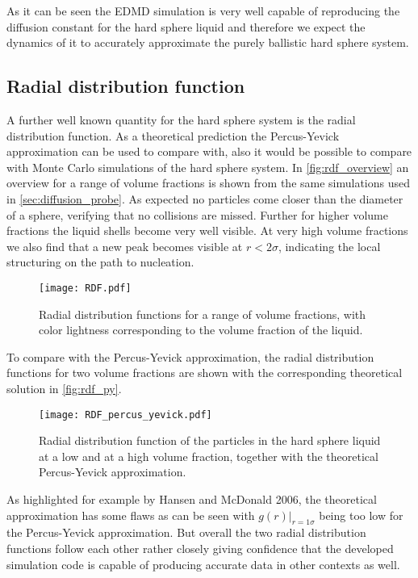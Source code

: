 As it can be seen the EDMD simulation is very well capable of reproducing the diffusion constant for the hard sphere liquid and therefore we expect the dynamics of it to accurately approximate the purely ballistic hard sphere system.

\subsection{Radial distribution function}
\label{sec:RDF_prob}
A further well known quantity for the hard sphere system is the radial distribution function. As a theoretical prediction the Percus-Yevick approximation can be used to compare with, also it would be possible to compare with Monte Carlo simulations of the hard sphere system. In \autoref{fig:rdf_overview} an overview for a range of volume fractions is shown from the same simulations used in \autoref{sec:diffusion_probe}. As expected no particles come closer than the diameter of a sphere, verifying that no collisions are missed. Further for higher volume fractions the liquid shells become very well visible. At very high volume fractions we also find that a new peak becomes visible at $r < 2 \sigma$, indicating the local structuring on the path to nucleation.

\begin{figure}[h]
\centering
\texttt{[image: RDF.pdf]}
\caption[Radial distribution functions at varying volume fractions]{Radial distribution functions for a range of volume fractions, with color lightness corresponding to the volume fraction of the liquid.}
\label{fig:rdf_overview}
\end{figure}

To compare with the Percus-Yevick approximation, the radial distribution functions for two volume fractions are shown with the corresponding theoretical solution in \autoref{fig:rdf_py}.
\begin{figure}[h]
\centering
\texttt{[image: RDF\_percus\_yevick.pdf]}
\caption[Radial distribution function with Percus-Yevick solution]{Radial distribution function of the particles in the hard sphere liquid at a low and at a high volume fraction, together with the theoretical Percus-Yevick approximation.}
\label{fig:rdf_py}
\end{figure}

As highlighted for example by Hansen and McDonald 2006\cite{Hansen2006}, the theoretical approximation has some flaws as can be seen with $g(r)|_{r=1\sigma}$ being too low for the Percus-Yevick approximation. But overall the two radial distribution functions follow each other rather closely giving confidence that the developed simulation code is capable of producing accurate data in other contexts as well.\\

